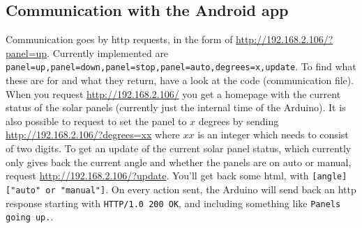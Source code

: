 		\subsection{Communication with the Android app} \label{arduinoToAndroid}
			Communication goes by http requests, in the form of \url{http://192.168.2.106/?panel=up}.
			Currently implemented are \verb|panel=up,panel=down,panel=stop,panel=auto,degrees=x,update|.
			To find what these are for and what they return, have a look at the code (communication file).
			When you request \url{http://192.168.2.106/} you get a homepage with the current status of the solar panels (currently just the internal time of the Arduino).
			It is also possible to request to set the panel to $x$ degrees by sending \url{http://192.168.2.106/?degrees=xx} where $xx$ is an integer which needs to consist of two digits.
			To get an update of the current solar panel status, which currently only gives back the current angle and whether the panels are on auto or manual, request \url{http://192.168.2.106/?update}.
			You'll get back some html, with \verb|[angle] ["auto" or "manual"]|.
			On every action sent, the Arduino will send back an http response starting with \verb|HTTP/1.0 200 OK|, and including something like \verb|Panels going up.|.
